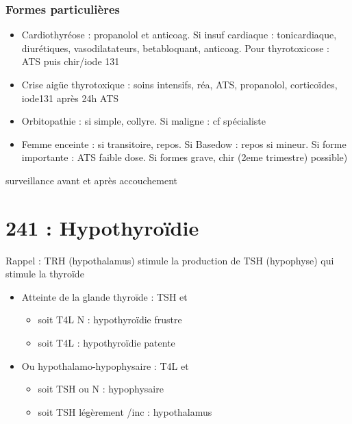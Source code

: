 \documentclass[11pt]{article}
\begin{document}
\subsubsection{Formes particulières}
\label{sec:orge5ed55c}
\begin{itemize}
\item Cardiothyréose : propanolol et anticoag. Si insuf cardiaque : tonicardiaque,
diurétiques, vasodilatateurs, betabloquant, anticoag. Pour thyrotoxicose : ATS
puis chir/iode 131
\item Crise aigüe thyrotoxique : soins intensifs, réa, ATS, propanolol, corticoïdes,
iode131 après 24h ATS
\item Orbitopathie : si simple, collyre. Si maligne : cf spécialiste
\item Femme enceinte : si transitoire, repos. Si Basedow : repos si mineur. Si forme
importante : ATS faible dose. Si formes grave, chir (2eme trimestre) possible)
\end{itemize}
\thus surveillance avant et après accouchement  

\section{241 : Hypothyroïdie}
\label{sec:orgeee89fa}
\begin{tcolorbox}
Rappel : TRH (hypothalamus) stimule la production de TSH (hypophyse) qui stimule la thyroïde
\end{tcolorbox}

\begin{itemize}
\item Atteinte de la glande thyroïde  : \inc TSH et 
\begin{itemize}
\item soit T4L N : hypothyroïdie frustre
\item soit T4L \dec : hypothyroïdie patente
\end{itemize}
\item Ou hypothalamo-hypophysaire : T4L \dec et 
\begin{itemize}
\item soit TSH \dec ou N : hypophysaire
\item soit TSH légèrement /inc : hypothalamus
\end{itemize}
\end{itemize}
\end{document}
